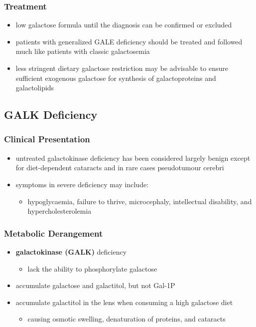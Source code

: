 \documentclass{scrartcl}
\begin{document}
\subsubsection{Treatment}
\label{sec:orgd9d36bc}
\begin{itemize}
\item low galactose formula until the diagnosis can be confirmed or excluded
\item patients with generalized GALE deficiency should be treated and
followed much like patients with classic galactosemia
\item less stringent dietary galactose restriction may be advisable to
ensure sufficient exogenous galactose for synthesis of
galactoproteins and galactolipids
\end{itemize}
\subsection{GALK Deficiency}
\label{sec:orgea8bc7f}
\subsubsection{Clinical Presentation}
\label{sec:org7c4fcb0}
\begin{itemize}
\item untreated galactokinase deficiency has been considered largely
benign except for diet-dependent cataracts and in rare cases pseudotumour cerebri
\item symptoms in severe deficiency may include:
\begin{itemize}
\item hypoglycaemia, failure to thrive, microcephaly, intellectual
disability, and hypercholesterolemia
\end{itemize}
\end{itemize}

\subsubsection{Metabolic Derangement}
\label{sec:orgb2a654b}
\begin{itemize}
\item \textbf{galactokinase (GALK)} deficiency
\begin{itemize}
\item lack the ability to phosphorylate galactose
\end{itemize}
\item accumulate galactose and galactitol, but not Gal-1P
\item accumulate galactitol in the lens when consuming a high galactose diet
\begin{itemize}
\item causing osmotic swelling, denaturation of proteins, and cataracts
\end{itemize}
\end{itemize}
\end{document}
